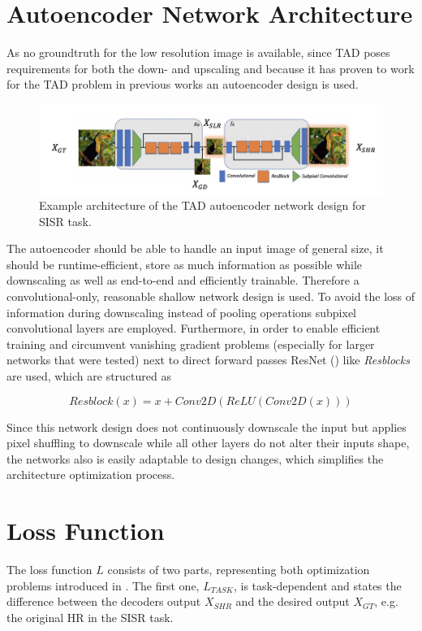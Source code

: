 \section{Autoencoder Network Architecture}
\label{sec:Approach_ANA}
As no groundtruth for the low resolution image is available, since \ac{TAD} poses requirements for both the down- and upscaling and because it has proven to work for the \ac{TAD} problem in previous works an autoencoder design is used.

\begin{figure}[!htbp]
	\centering
	\includegraphics[width=14cm]{figures/architecture_example.png}
	\caption{Example architecture of the \ac{TAD} autoencoder network design for \ac{SISR} task.}
  \label{fig:architecture}
\end{figure}

The autoencoder should be able to handle an input image of general size, it should be runtime-efficient, store as much information as possible while downscaling as well as end-to-end and efficiently trainable.
Therefore a convolutional-only, reasonable shallow network design is used. To avoid the loss of information during downscaling instead of pooling operations subpixel convolutional layers are employed. Furthermore, in order to enable efficient training and circumvent vanishing gradient problems (especially for larger networks that were tested) next to direct forward passes ResNet (\cite{DRLFIR}) like \textit{Resblocks} are used, which are structured as

$$Resblock(x) = x + Conv2D(ReLU(Conv2D(x)))$$

Since this network design does not continuously downscale the input but
applies pixel shuffling to downscale while all other layers do not alter their inputs shape, the networks also is easily adaptable to design changes, which simplifies the architecture optimization process.

\section{Loss Function}
\label{sec:Approach_LF}
The loss function $L$ consists of two parts, representing both optimization problems introduced in . The first one, $L_{TASK}$, is task-dependent and states the difference between the decoders output $X_{SHR}$ and the desired output $X_{GT}$, e.g. the original \ac{HR} in the \ac{SISR} task.

